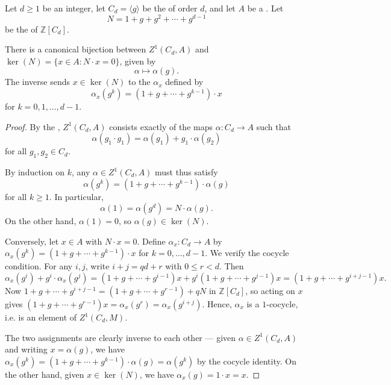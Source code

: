 \begin{theorem} \label{lemma:first_cocycles_of_a_cyclic_group_with_values_in_a_module_are_kernels_of_the_norm_element}
    Let $d \geq 1$ be an integer, let $C_d = \langle g \rangle$ be the  of order $d$, and let $A$ be a . Let
    $$N = 1 + g + g^2 + \cdots + g^{d-1}$$
    be the  of $\mathbb{Z}[C_d]$.

    There is a canonical bijection between $Z^1(C_d, A)$  and $\ker(N) = \{x \in A : N \cdot x = 0\}$, given by
    $$\alpha \mapsto \alpha(g).$$
    The inverse sends $x \in \ker(N)$ to the  $\alpha_x$ defined by
    $$\alpha_x(g^k) = (1 + g + \cdots + g^{k-1}) \cdot x$$
    for $k = 0, 1, \ldots, d-1$.
\end{theorem}

\begin{proof}
    By the , $Z^1(C_d,A)$ consists exactly of the maps $\alpha: C_d \to A$ such that 
    $$\alpha(g_1 \cdot g_1) = \alpha(g_1) + g_1 \cdot \alpha(g_2)$$
    for all $g_1, g_2 \in C_d$.

    By induction on $k$, any $\alpha \in Z^1(C_d,A)$ must thus satisfy
    $$\alpha(g^k) = (1 + g + \cdots + g^{k-1}) \cdot \alpha(g)$$
    for all $k \geq 1$. In particular, 
    $$\alpha(1) = \alpha(g^d) = N \cdot \alpha(g).$$
    On the other hand, $\alpha(1) = 0$, so $\alpha(g) \in \ker(N)$. 

    Conversely, let $x \in A$ with $N \cdot x = 0$. Define $\alpha_x : C_d \to A$ by $\alpha_x(g^k) = (1 + g + \cdots + g^{k-1}) \cdot x$ for $k = 0, \ldots, d-1$. We verify the cocycle condition. For any $i,j$, write $i+j = qd + r$ with $0 \leq r < d$. Then
    $$\alpha_x(g^i) + g^i \cdot \alpha_x(g^j) = (1 + g + \cdots + g^{i-1})x + g^i(1 + g + \cdots + g^{j-1})x = (1 + g + \cdots + g^{i+j-1})x.$$
    Now $1 + g + \cdots + g^{i+j-1} = (1 + g + \cdots + g^{r-1}) + qN$ in $\mathbb{Z}[C_d]$, so acting on $x$ gives $(1 + g + \cdots + g^{r-1})x = \alpha_x(g^r) = \alpha_x(g^{i+j})$. Hence, $\alpha_x$ is a $1$-cocycle, i.e. is an element of $Z^1(C_d,M)$.

    The two assignments are clearly inverse to each other ---  given $\alpha \in Z^1(C_d, A)$ and writing $x = \alpha(g)$, we have $\alpha_x(g^k) = (1 + g + \cdots + g^{k-1})\cdot \alpha(g) = \alpha(g^k)$ by the cocycle identity. On the other hand, given $x \in \ker(N)$, we have $\alpha_x(g) = 1 \cdot x = x$.
\end{proof}

